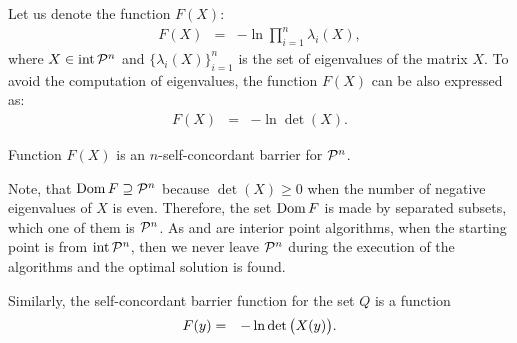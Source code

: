Let us denote the function $F(X)$:
\begin{eqnarray}
  F(X) &=& -\ln\prod_{i=1}^{n}\lambda_i(X),
\end{eqnarray}
where $X\in\operatorname{int}\mathcal{P}^n$ and $\big\{\lambda_i(X)\big\}_{i=1}^n$ is the set of eigenvalues of the matrix $X$.
To avoid the computation of eigenvalues, the function $F(X)$ can be also expressed as:
\begin{eqnarray}
  F(X) &=& -\ln\det(X).
\end{eqnarray}

\begin{theorem}
  Function $F(X)$ is an $n$-self-concordant barrier for $\mathcal{P}^n$.
\end{theorem}

Note, that $\operatorname{Dom} F \supseteq \mathcal{P}^n$ because $\det(X) \geq 0$ when the number of negative eigenvalues of $X$ is even. Therefore, the set $\operatorname{Dom} F$ is made by separated subsets, which one of them is $\mathcal{P}^n$. As  and  are interior point algorithms, when the starting point is from $\operatorname{int}\mathcal{P}^n$, then we never leave $\mathcal{P}^n$ during the execution of the algorithms and the optimal solution is found.

Similarly, the self-concordant barrier function for the set $Q$ is a function 
\begin{eqnarray}
  F(y) &=& -\ln\det\big(X(y)\big). \labeleq{SDP:bf:bfy}
\end{eqnarray}

